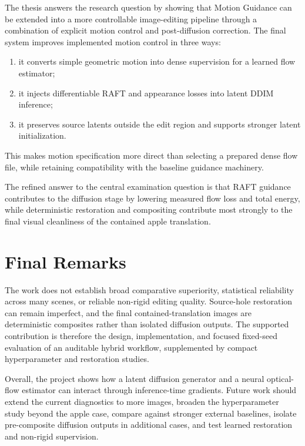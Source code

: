 The thesis answers the research question by showing that Motion Guidance can be extended into a more controllable image-editing pipeline through a combination of explicit motion control and post-diffusion correction. The final system improves implemented motion control in three ways:

\begin{enumerate}
  \item it converts simple geometric motion into dense supervision for a learned flow estimator;
  \item it injects differentiable RAFT and appearance losses into latent DDIM inference;
  \item it preserves source latents outside the edit region and supports stronger latent initialization.
\end{enumerate}

This makes motion specification more direct than selecting a prepared dense flow file, while retaining compatibility with the baseline guidance machinery.

The refined answer to the central examination question is that RAFT guidance contributes to the diffusion stage by lowering measured flow loss and total energy, while deterministic restoration and compositing contribute most strongly to the final visual cleanliness of the contained apple translation.

\section{Final Remarks}

The work does not establish broad comparative superiority, statistical reliability across many scenes, or reliable non-rigid editing quality. Source-hole restoration can remain imperfect, and the final contained-translation images are deterministic composites rather than isolated diffusion outputs. The supported contribution is therefore the design, implementation, and focused fixed-seed evaluation of an auditable hybrid workflow, supplemented by compact hyperparameter and restoration studies.

Overall, the project shows how a latent diffusion generator and a neural optical-flow estimator can interact through inference-time gradients. Future work should extend the current diagnostics to more images, broaden the hyperparameter study beyond the apple case, compare against stronger external baselines, isolate pre-composite diffusion outputs in additional cases, and test learned restoration and non-rigid supervision.

